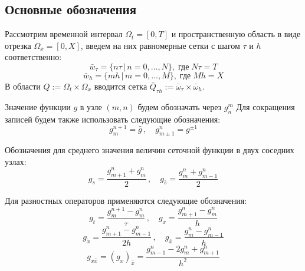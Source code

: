 \subsection{Основные обозначения}
Рассмотрим временной интервал $\Omega_t = [0,T]$ и пространственную область в виде отрезка $\Omega_x = [0, X]$, введем на них равномерные сетки с шагом $\tau$ и $h$ соответственно:
$$ \bar w_{\tau} = \{n \tau \,|\, n = 0,\dots,N\}, \;\text{где}\; N \tau = T $$
$$ \bar w_{h} = \{mh \,|\, m = 0,\dots,M\}, \;\text{где}\; Mh = X $$
В области $ Q := \Omega_{t} \times \Omega_{x} $ 
вводится сетка $ \bar Q_{\tau h} := \bar \omega_{\tau} \times \bar \omega_{h} $.


Значение функции $g$ в узле $(m, n)$ будем обозначать через $g_{n}^{m}$
Для сокращения записей будем также использовать следующие обозначения:\label{obozn}
$$ 
  g_{m}^{n+1} = \hat g 
  \,,\quad 
  g_{m \pm 1}^{n} = g^{\pm 1} 
$$

Обозначения для среднего значения величин сеточной функции в двух соседних узлах:
$$
  g_{s} = \frac{g_{m+1}^{n} + g_{m}^{n}}{2}
  \,,\quad
  g_{\bar s} = \frac {g_{m}^{n} + g_{m-1}^{n}}{2}
$$

Для разностных операторов применяются следующие обозначения:
$$
  g_{t}=\frac{g_{m}^{n+1}-g_{m}^{n}}{\tau}
  \,,\quad
  g_{x}=\frac{g_{m+1}^{n}-g_{m}^{n}}{h}
$$
$$
  g_{\mathring{x}} = \frac{g^n_{m + 1} - g^n_{m - 1}}{2 h}
  \,,\quad
  g_{\bar{x}}=\frac{g_{m}^{n}-g_{m-1}^{n}}{h}
$$
$$
  g_{x \bar{x}}= (g_{x})_{\bar{x}} 
  = \frac{g_{m-1}^{n}-2 g_{m}^{n}+g_{m+1}^{n}}{h^{2}}
$$
